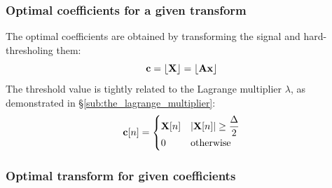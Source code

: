 \documentclass[11pt,a4paper,openright,twoside]{book}
\numberwithin{equation}{section} %
\numberwithin{figure}{section} %
\numberwithin{table}{section} %
\begin{document}
\subsubsection{Optimal coefficients for a given transform}
\label{ssub:optimal_coefficients_for_a_given_transform}

The optimal coefficients are obtained by transforming the signal and
hard-thresholing them:
\begin{equation}
	\mathbf{c} = \lfloor \mathbf{X} \rfloor = \lfloor \mathbf{A} \mathbf{x} \rfloor
\end{equation}
The threshold value is tightly related to the Lagrange multiplier $\lambda$,
as demonstrated in \S\ref{sub:the_lagrange_multiplier}:
\begin{equation}
	\mathbf{c}[n] =
	\begin{cases}
		\mathbf{X}[n] & \vert \mathbf{X}[n] \vert \ge \displaystyle \frac{\Delta}{2} \\
		0     & \text{otherwise} \\
	\end{cases}
	\label{eqn:hard_threshold}
\end{equation}

\subsubsection{Optimal transform for given coefficients}
\label{ssub:optimal_transform_for_given_coefficients}
\end{document}
